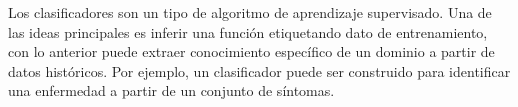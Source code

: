 

	Los clasificadores son un tipo de algoritmo de aprendizaje supervisado. Una de las ideas principales es inferir una función etiquetando dato de entrenamiento, con lo anterior puede extraer conocimiento específico de un dominio a partir de datos históricos. Por ejemplo, un clasificador puede ser construido para identificar una enfermedad a partir de un conjunto de síntomas.
	

 





